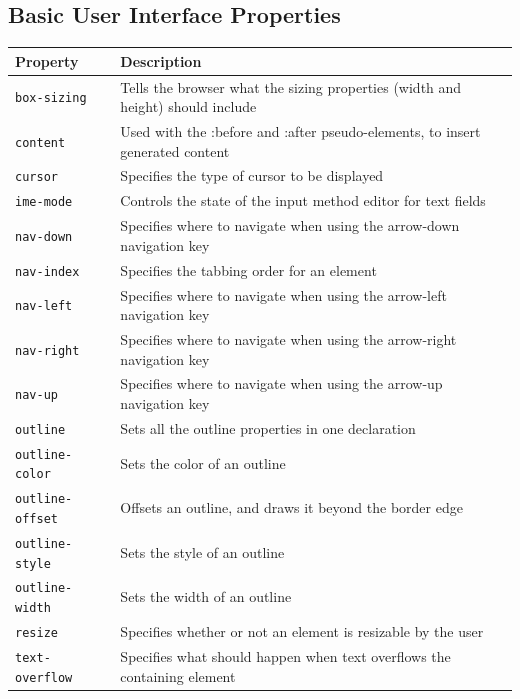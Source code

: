 \documentclass[11pt, letterpaper]{article}
\begin{document}
		\subsection{Basic User Interface Properties}
			\begin{longtable}{p{5cm} p{10cm}}
				\toprule
				Property & Description \\\midrule 
				\texttt{box-sizing} & Tells the browser what the sizing properties (width and height) should include \\\midrule
				\texttt{content} & Used with the :before and :after pseudo-elements, to insert generated content \\\midrule
				\texttt{cursor} & Specifies the type of cursor to be displayed \\\midrule
				\texttt{ime-mode} & Controls the state of the input method editor for text fields \\\midrule
				\texttt{nav-down} & Specifies where to navigate when using the arrow-down navigation key \\\midrule
				\texttt{nav-index} & Specifies the tabbing order for an element \\\midrule
				\texttt{nav-left} & Specifies where to navigate when using the arrow-left navigation key \\\midrule
				\texttt{nav-right} & Specifies where to navigate when using the arrow-right navigation key \\\midrule
				\texttt{nav-up} & Specifies where to navigate when using the arrow-up navigation key \\\midrule
				\texttt{outline} & Sets all the outline properties in one declaration \\\midrule
				\texttt{outline-color} & Sets the color of an outline \\\midrule
				\texttt{outline-offset} & Offsets an outline, and draws it beyond the border edge \\\midrule
				\texttt{outline-style} & Sets the style of an outline \\\midrule
				\texttt{outline-width} & Sets the width of an outline \\\midrule
				\texttt{resize} & Specifies whether or not an element is resizable by the user \\\midrule
				\texttt{text-overflow} & Specifies what should happen when text overflows the containing element \\\midrule
			\end{longtable}
\end{document}
